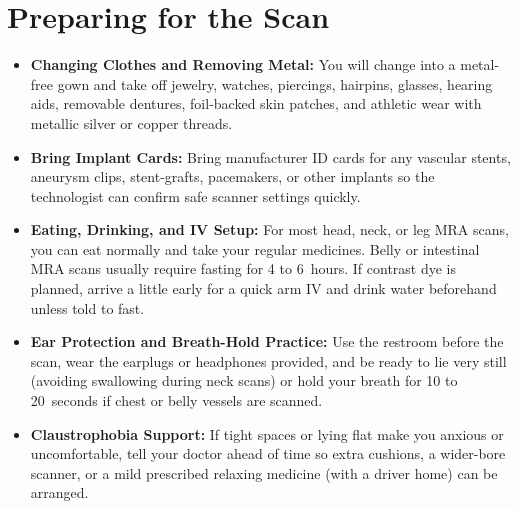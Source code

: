 \section{Preparing for the Scan}
\begin{itemize}
\item \textbf{Changing Clothes and Removing Metal:} You will change into a metal-free gown and take off jewelry, watches, piercings, hairpins, glasses, hearing aids, removable dentures, foil-backed skin patches, and athletic wear with metallic silver or copper threads.
\item \textbf{Bring Implant Cards:} Bring manufacturer ID cards for any vascular stents, aneurysm clips, stent-grafts, pacemakers, or other implants so the technologist can confirm safe scanner settings quickly.
\item \textbf{Eating, Drinking, and IV Setup:} For most head, neck, or leg MRA scans, you can eat normally and take your regular medicines. Belly or intestinal MRA scans usually require fasting for 4 to 6~hours. If contrast dye is planned, arrive a little early for a quick arm IV and drink water beforehand unless told to fast.
\item \textbf{Ear Protection and Breath-Hold Practice:} Use the restroom before the scan, wear the earplugs or headphones provided, and be ready to lie very still (avoiding swallowing during neck scans) or hold your breath for 10 to 20~seconds if chest or belly vessels are scanned.
\item \textbf{Claustrophobia Support:} If tight spaces or lying flat make you anxious or uncomfortable, tell your doctor ahead of time so extra cushions, a wider-bore scanner, or a mild prescribed relaxing medicine (with a driver home) can be arranged.
\end{itemize}

